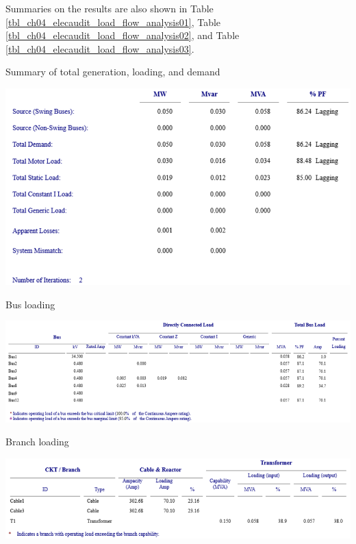 Summaries on the results are also shown in Table \ref{tbl_ch04_elecaudit_load_flow_analysis01}, Table \ref{tbl_ch04_elecaudit_load_flow_analysis02}, and Table \ref{tbl_ch04_elecaudit_load_flow_analysis03}.



\begin{table}[!htb]
	\caption{Summary of total generation, loading, and demand}
	\label{tbl_ch04_elecaudit_load_flow_analysis01}
	\includegraphics[scale=0.3]{tables/tbl_ch04_elecaudit_load_flow_analysis01}		
\end{table}


\begin{table}[!htb]
	\caption{Bus loading}
	\label{tbl_ch04_elecaudit_load_flow_analysis02}
	\includegraphics[width=\textwidth]{tables/tbl_ch04_elecaudit_load_flow_analysis02}		
\end{table}


\begin{table}[!htb]
	\caption{Branch loading}
	\label{tbl_ch04_elecaudit_load_flow_analysis03}
	\includegraphics[width=\textwidth]{tables/tbl_ch04_elecaudit_load_flow_analysis03}		
\end{table}

